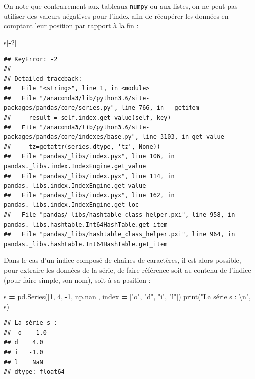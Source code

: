 \documentclass[12pt,]{book}
\newenvironment{Shaded}{\begin{snugshade}}{\end{snugshade}}
\newcommand{\DecValTok}[1]{\textcolor[rgb]{0.00,0.00,0.81}{#1}}
\newcommand{\CharTok}[1]{\textcolor[rgb]{0.31,0.60,0.02}{#1}}
\newcommand{\StringTok}[1]{\textcolor[rgb]{0.31,0.60,0.02}{#1}}
\newcommand{\OperatorTok}[1]{\textcolor[rgb]{0.81,0.36,0.00}{\textbf{#1}}}
\newcommand{\BuiltInTok}[1]{#1}
\newcommand{\NormalTok}[1]{#1}
\numberwithin{equation}{section}
\numberwithin{countremarque}{section}
\begin{document}
On note que contrairement aux tableaux \texttt{numpy} ou aux listes, on
ne peut pas utiliser des valeurs négatives pour l'index afin de
récupérer les données en comptant leur position par rapport à la fin :

\begin{Shaded}
\begin{Highlighting}[]
\NormalTok{s[}\OperatorTok{-}\DecValTok{2}\NormalTok{]}
\end{Highlighting}
\end{Shaded}

\begin{lstlisting}
## KeyError: -2
## 
## Detailed traceback: 
##   File "<string>", line 1, in <module>
##   File "/anaconda3/lib/python3.6/site-packages/pandas/core/series.py", line 766, in __getitem__
##     result = self.index.get_value(self, key)
##   File "/anaconda3/lib/python3.6/site-packages/pandas/core/indexes/base.py", line 3103, in get_value
##     tz=getattr(series.dtype, 'tz', None))
##   File "pandas/_libs/index.pyx", line 106, in pandas._libs.index.IndexEngine.get_value
##   File "pandas/_libs/index.pyx", line 114, in pandas._libs.index.IndexEngine.get_value
##   File "pandas/_libs/index.pyx", line 162, in pandas._libs.index.IndexEngine.get_loc
##   File "pandas/_libs/hashtable_class_helper.pxi", line 958, in pandas._libs.hashtable.Int64HashTable.get_item
##   File "pandas/_libs/hashtable_class_helper.pxi", line 964, in pandas._libs.hashtable.Int64HashTable.get_item
\end{lstlisting}

Dans le cas d'un indice composé de chaînes de caractères, il est alors
possible, pour extraire les données de la série, de faire référence soit
au contenu de l'indice (pour faire simple, son nom), soit à sa position
:

\begin{Shaded}
\begin{Highlighting}[]
\NormalTok{s }\OperatorTok{=}\NormalTok{ pd.Series([}\DecValTok{1}\NormalTok{, }\DecValTok{4}\NormalTok{, }\OperatorTok{-}\DecValTok{1}\NormalTok{, np.nan],}
\NormalTok{             index }\OperatorTok{=}\NormalTok{ [}\StringTok{"o"}\NormalTok{, }\StringTok{"d"}\NormalTok{, }\StringTok{"i"}\NormalTok{, }\StringTok{"l"}\NormalTok{])}
\BuiltInTok{print}\NormalTok{(}\StringTok{"La série s : }\CharTok{\textbackslash{}n}\StringTok{"}\NormalTok{, s)}
\end{Highlighting}
\end{Shaded}

\begin{lstlisting}
## La série s : 
##  o    1.0
## d    4.0
## i   -1.0
## l    NaN
## dtype: float64
\end{lstlisting}
\end{document}
